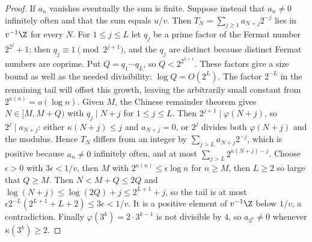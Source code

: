 \begin{proof}
If $a_n$ vanishes eventually the sum is finite. Suppose instead that
$a_n\ne0$ infinitely often and that the sum equals $u/v$. Then
$T_N=\sum_{j\ge1}a_{N+j}2^{-j}$ lies in $v^{-1}\Z$ for every $N$. For
$1\le j\le L$ let $q_j$ be a prime factor of the Fermat number
$2^{2^j}+1$; then $q_j\equiv1\pmod{2^{j+1}}$, and the $q_j$ are distinct
because distinct Fermat numbers are coprime. Put $Q=q_1\cdots q_L$, so
$Q<2^{2^{L+1}}$. These factors give a size bound as well as the needed
divisibility: $\log Q=O(2^L)$. The factor $2^{-L}$ in the remaining
tail will offset this growth, leaving the arbitrarily small constant
from $2^{\kappa(n)}=o(\log n)$.
Given $M$, the Chinese remainder theorem gives
$N\in[M,M+Q)$ with $q_j\mid N+j$ for $1\le j\le L$. Then
$2^{j+1}\mid\varphi(N+j)$, so $2^j\mid a_{N+j}$: either
$\kappa(N+j)\le j$ and $a_{N+j}=0$, or $2^j$ divides both $\varphi(N+j)$
and the modulus. Hence $T_N$ differs from an integer by
$\sum_{j>L}a_{N+j}2^{-j}$, which is positive because $a_n\ne0$
infinitely often, and at most $\sum_{j>L}2^{\kappa(N+j)-j}$. Choose
$\epsilon>0$ with $3\epsilon<1/v$, then $M$ with
$2^{\kappa(n)}\le\epsilon\log n$ for $n\ge M$, then $L\ge2$ so large that
$Q\ge M$. Then $N<M+Q\le2Q$ and $\log(N+j)\le\log(2Q)+j\le2^{L+1}+j$, so
the tail is at most $\epsilon2^{-L}(2^{L+1}+L+2)\le3\epsilon<1/v$. It is a
positive element of $v^{-1}\Z$ below $1/v$, a contradiction. Finally $\varphi(3^k)=2\cdot3^{k-1}$ is not divisible by
$4$, so $a_{3^k}\ne0$ whenever $\kappa(3^k)\ge2$.
\end{proof}

